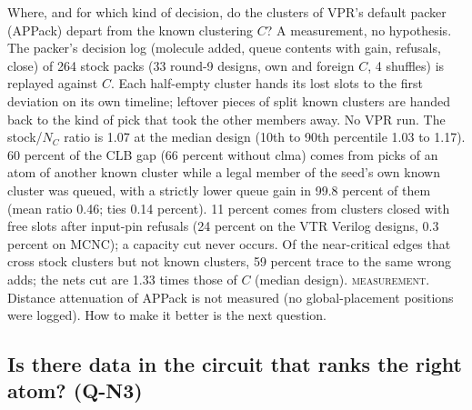  Where, and for which kind of decision, do the clusters of VPR's default packer (APPack) depart from the known clustering $C$? A measurement, no hypothesis.
 The packer's decision log (molecule added, queue contents with gain, refusals, close) of 264 stock packs (33 round-9 designs, own and foreign $C$, 4 shuffles) is replayed against $C$. Each half-empty cluster hands its lost slots to the first deviation on its own timeline; leftover pieces of split known clusters are handed back to the kind of pick that took the other members away. No VPR run.
 The stock/$N_C$ ratio is 1.07 at the median design (10th to 90th percentile 1.03 to 1.17). 60 percent of the CLB gap (66 percent without clma) comes from picks of an atom of another known cluster while a legal member of the seed's own known cluster was queued, with a strictly lower queue gain in 99.8 percent of them (mean ratio 0.46; ties 0.14 percent). 11 percent comes from clusters closed with free slots after input-pin refusals (24 percent on the VTR Verilog designs, 0.3 percent on MCNC); a capacity cut never occurs. Of the near-critical edges that cross stock clusters but not known clusters, 59 percent trace to the same wrong adds; the nets cut are 1.33 times those of $C$ (median design).
 \textsc{measurement}. Distance attenuation of APPack is not measured (no global-placement positions were logged). How to make it better is the next question.

\subsection{Is there data in the circuit that ranks the right atom? (Q-N3)}
\label{sec:e-q3}


